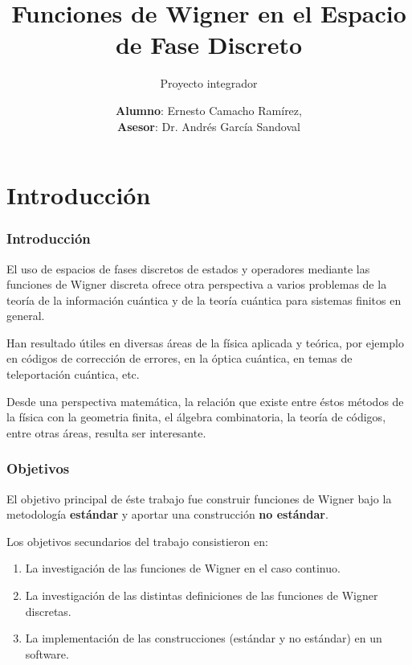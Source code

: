 \documentclass[10pt, spanish]{beamer}
\title{Funciones de Wigner en el Espacio de Fase Discreto}
\subtitle{Proyecto integrador}
\author{
  \textbf{Alumno}: Ernesto Camacho Ramírez,\\
  \textbf{Asesor}: Dr. Andrés García Sandoval}
\institute{
  Centro Universitario de Ciencias Exactas e Ingenierías
  \and
  Universidad de Guadalajara
}
\begin{document}
  \maketitle

  \section{Introducción}

  \begin{frame}
    \frametitle{Introducción}

    El uso de espacios de fases discretos de
    estados y operadores mediante las funciones de Wigner
    discreta ofrece otra perspectiva a varios problemas de
    la teoría de la información cuántica y de la teoría
    cuántica para sistemas finitos en general.

    \vspace{15pt}

    \pause

    Han resultado útiles en diversas áreas de la física
    aplicada y teórica, por ejemplo en códigos de corrección
    de errores, en la óptica cuántica, en temas de
    teleportación cuántica, etc. 

    \vspace{15pt}

    \pause

    Desde una perspectiva matemática, la relación que existe
    entre éstos métodos de la física con la geometria
    finita, el álgebra combinatoria, la teoría de códigos,
    entre otras áreas, resulta ser interesante.
  \end{frame}

  \begin{frame}
    \frametitle{Objetivos}

    El objetivo principal de éste trabajo fue construir
    funciones de Wigner bajo la metodología
    \textbf{estándar} y aportar una construcción \textbf{no
    estándar}.

    \vspace{10pt}

    Los objetivos secundarios del trabajo consistieron en:
    \begin{enumerate}
      \item La investigación de las funciones de Wigner en
        el caso continuo.
      \item La investigación de las distintas definiciones
        de las funciones de Wigner discretas.
      \item La implementación de las construcciones
        (estándar y no estándar) en un software.
    \end{enumerate}
  \end{frame}
\end{document}
